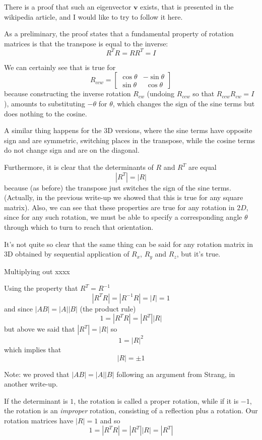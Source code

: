 \documentclass[11pt, oneside]{article}
\begin{document}
There is a proof that such an eigenvector $\mathbf{v}$ exists, that is presented in the wikipedia article, and I would like to try to follow it here.

As a preliminary, the proof states that a fundamental property of rotation matrices is that the transpose is equal to the inverse:
\[ R^T R = R R^T = I \]

We can certainly see that is true  for 
\[ R_{ccw} = 
\begin{bmatrix}  
\cos \theta  & -\sin \theta \\  
\sin \theta & \ \ \cos \theta  
\end{bmatrix}
\]
because constructing the inverse rotation $R_{cw}$ (undoing $R_{ccw}$ so that $R_{ccw} R_{cw} = I$), amounts to substituting $-\theta$ for $\theta$, which changes the sign of the sine terms but does nothing to the cosine.  

A similar thing happens for the 3D versions, where the sine terms have opposite sign and are symmetric, switching places in the transpose, while the cosine terms do not change sign and are on the diagonal.

Furthermore, it is clear that the determinants of $R$ and $R^T$ are equal
\[ | R^T| = |R| \]
because (as before) the transpose just switches the sign of the sine terms.  (Actually, in the previous write-up we showed that this is true for any square matrix).  Also, we can see that these properties are true for any rotation in $2D$, since for any such rotation, we must be able to specify a corresponding angle $\theta$ through which to turn to reach that orientation.

It's not quite so clear that the same thing can be said for any rotation matrix in 3D obtained by sequential application of $R_x$, $R_y$ and $R_z$, but it's true.  

Multiplying out 
xxxx

Using the property that $R^T = R^{-1}$ 
\[ |R^T R| = |R^{-1} R| =  |I| = 1 \]
and since $|AB| = |A| |B|$ (the product rule)
\[ 1 = |R^T R| = |R^T| |R| \]
but above we said that $|R^T| = |R|$ so
\[ 1 = |R|^2 \]
which implies that
\[ |R| = \pm 1 \]

Note:  we proved that $|AB| = |A| |B|$ following an argument from Strang, in another write-up.

If the determinant is $1$, the rotation is called a proper rotation, while if it is $-1$, the rotation is an \emph{improper} rotation, consisting of a reflection plus a rotation.  Our rotation matrices have $|R| = 1$ and so 
\[ 1 = |R^T R| = |R^T| |R| = |R^T| \]
\end{document}
